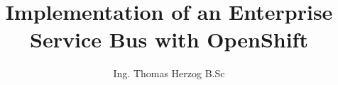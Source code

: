\documentclass[master,english]{hgbthesis}
\title{Implementation of an Enterprise Service Bus with OpenShift} %
\author{Ing. Thomas Herzog B.Sc}
\begin{document}

\frontmatter							%

\maketitle
\tableofcontents



\mainmatter          			%











\appendix                                         %


\MakeBibliography                     				%
%

\end{document}
